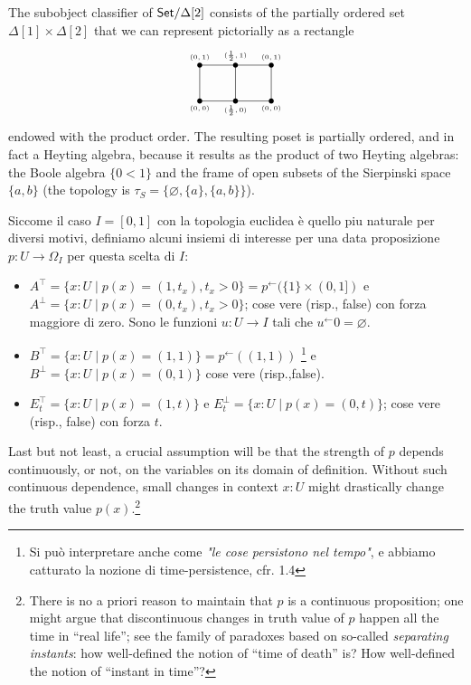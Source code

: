 \begin{remark}
	The subobject classifier of $\mathsf{Set}/\Delta[2]$ consists of the partially ordered set $\Delta[1]\times\Delta[2]$ that we can represent pictorially as a rectangle
	\[\begin{tikzpicture}[xscale=2]
			\foreach \i/\name in {0/0,.5/{\frac{1}{2}},1/0}{
			\foreach \j/\pos in {0/below,1/above}
			\fill (\i,\j) ellipse (1pt and 2pt) node[\pos] {\tiny $(\name,\j)$};
			}
			\draw (0,0) rectangle (1,1);
			\draw (.5,1) -- (.5,0);
		\end{tikzpicture}\]
	endowed with the product order. The resulting poset is partially ordered, and in fact a Heyting algebra, because it results as the product of two Heyting algebras: the Boole algebra $\{0<1\}$ and the frame of open subsets of the Sierpinski space $\{a,b\}$ (the topology is $\tau_S = \{\varnothing, \{a\}, \{a,b\}\}$).
\end{remark}
\begin{remark}
	Siccome il caso $I=[0,1]$ con la topologia euclidea è quello piu naturale per diversi motivi, definiamo alcuni insiemi di interesse per una data proposizione $p : U \to \Omega_I$ per questa scelta di $I$:
	\begin{itemize}
		\item $A^\top = \{x : U \mid p(x) = (1,t_x), t_x > 0\} = p^\leftarrow(\{1\}\times (0,1])$ e $A^\perp = \{x : U \mid p(x) = (0,t_x), t_x > 0\}$; cose vere (risp., false) con forza maggiore di zero. Sono le funzioni $u : U \to I$ tali che $u^\leftarrow 0 = \varnothing$.
		\item $B^\top = \{x : U \mid p(x) = (1,1)\} = p^\leftarrow((1,1))$ \footnote{Si può interpretare anche come \emph{"le cose persistono nel tempo"}, e abbiamo catturato la nozione di time-persistence, cfr. 1.4} e $B^\perp = \{x : U \mid p(x) = (0,1)\}$ cose vere (risp.,false).
		\item $E_t^\top = \{ x : U \mid p(x)=(1,t)\}$ e $E_t^\perp = \{ x : U \mid p(x)=(0,t)\}$; cose vere (risp., false) con forza $t$.
	\end{itemize}
\end{remark}
Last but not least, a crucial assumption will be that the strength of $p$ depends continuously, or not, on the variables on its domain of definition. Without such continuous dependence, small changes in context $x : U$ might drastically change the truth value $p(x)$.\footnote{There is no a priori reason to maintain that $p$ is a continuous proposition; one might argue that discontinuous changes in truth value of $p$ happen all the time in ``real life''; see the family of paradoxes based on so-called \emph{separating instants}: how well-defined the notion of ``time of death'' is? How well-defined the notion of ``instant in time''?}
